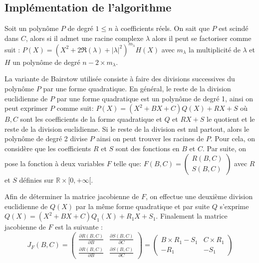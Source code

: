 \documentclass{article}
\begin{document}
\subsection{Implémentation de l'algorithme }
Soit un polynôme $P$ de degré $1 \leq n$ à coefficients réels. On sait que $P$ est scindé dans $C$, alors si il admet une racine complexe $\lambda$ alors il peut se factoriser comme suit : 
$P(X) = (X^{2} + 2\Re(\lambda) + |\lambda|^{2})^{m_{\lambda}} H(X)$ avec $m_{\lambda}$ la multiplicité de $\lambda$ et $H$ un polynôme de degré $n - 2\times m_{\lambda}$.

La variante de Bairstow utilisée consiste à faire des divisions successives du polynôme $P$ par une forme quadratique. En général, le reste de la division euclidienne de $P$ par une forme quadratique est un polynôme de degré 1, ainsi on peut exprimer $P$ comme suit:
$P(X) = (X^{2} + BX + C)Q(X) + RX + S$ où $B, C$ sont les coefficients de la forme quadratique et $Q$ et $RX + S$ le quotient et le reste de la division euclidienne. Si le reste de la division est nul partout, alors le polynôme de degré 2 divise $P$ ainsi on peut trouver les racines de $P$.
Pour cela, on considère que les coefficients $R$ et $S$ sont des fonctions en $B$ et $C$. Par suite, on pose la fonction à deux variables $F$ telle que: $ F(B, C) = \begin{pmatrix} R(B,C) \\ S(B,C) \end{pmatrix}$ avec $R$ et $S$ définies sur $\mathbb {R} \times [0, +\infty[ $.

Afin de déterminer la matrice jacobienne de $F$, on effectue une deuxième division euclidienne de $Q(X)$ par la même forme quadratique et par suite $Q$ s'exprime $Q(X) = (X^{2} + BX + C)Q_{1}(X) + R_{1}X + S_{1}$. Finalement la matrice jacobienne de $F$ est la suivante  : 
\[ J_{F}(B, C) = 
\begin{pmatrix} 
\frac{\partial R(B,C)}{\partial B} & \frac{\partial S(B,C)}{\partial C}
\\
\frac{\partial R(B,C)}{\partial B} & \frac{\partial S(B,C)}{\partial C}
\end{pmatrix} = 
\begin{pmatrix} 
B\times R_{1} - S_{1} & C\times R_{1}
\\
-R_{1}& - S_{1}
\end{pmatrix}
\] 
\end{document}
